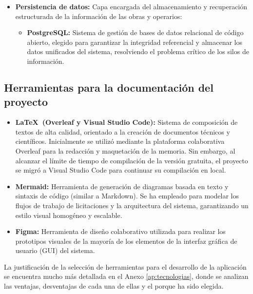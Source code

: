 \begin{itemize}
    \item \textbf{Persistencia de datos:} Capa encargada del almacenamiento y recuperación estructurada de la información de las obras y operarios:
    \begin{itemize}
        \item \textbf{PostgreSQL:} Sistema de gestión de bases de datos relacional de código abierto, elegido para garantizar la integridad referencial y almacenar los datos unificados del sistema, resolviendo el problema crítico de los silos de información.
    \end{itemize}
\end{itemize}
\subsection{Herramientas para la documentación del proyecto}
\begin{itemize}
    \item \textbf{\LaTeX\ (Overleaf y Visual Studio Code):} Sistema de composición de textos de alta calidad, orientado a la creación de documentos técnicos y científicos. Inicialmente se utilizó mediante la plataforma colaborativa Overleaf para la redacción y maquetación de la memoria. Sin embargo, al alcanzar el límite de tiempo de compilación de la versión gratuita, el proyecto se migró a Visual Studio Code para continuar su compilación en local.
    \item \textbf{Mermaid:} Herramienta de generación de diagramas basada en texto y sintaxis de código (similar a Markdown). Se ha empleado para modelar los flujos de trabajo de licitaciones y la arquitectura del sistema, garantizando un estilo visual homogéneo y escalable.
    \item \textbf{Figma:} Herramienta de diseño colaborativo utilizada para realizar los prototipos visuales de la mayoría de los elementos de la interfaz gráfica de usuario (GUI) del sistema.
\end{itemize}

La justificación de la selección de herramientas para el desarrollo de la aplicación se encuentra mucho más detallada en el Anexo \ref{ap:tecnologias}, donde se analizan las ventajas, desventajas de cada una de ellas y el porque ha sido elegida.